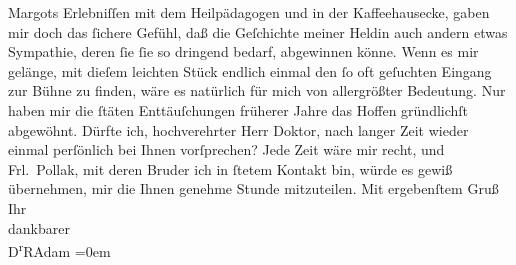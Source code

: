 \begin{ledgroupsized}[t]{13cm}
                  Margots Erlebniſſen mit dem
               Heilpädagogen und in der Kaffeehausecke, gaben mir doch das ſichere Gefühl, daß die
               Geſchichte meiner Heldin auch andern etwas Sympathie, deren ſie ſie so dringend
               bedarf, abgewinnen könne. Wenn es mir gelänge, mit dieſem leichten Stück endlich
               einmal den ſo oft geſuchten Eingang zur Bühne zu finden, wäre es natürlich für mich
               von allergrößter Bedeutung. Nur haben mir die ſtäten Enttäuſchungen früherer Jahre
               das Hoffen gründlichſt abgewöhnt.\pend
           \pstart
           {\pb}Dürfte ich, hochverehrter Herr Doktor,
               nach langer Zeit wieder einmal perſönlich bei Ihnen vorſprechen? Jede Zeit wäre mir
               recht, und Frl. Pollak, mit deren Bruder ich in ſtetem Kontakt
               bin, würde es gewiß übernehmen, mir die Ihnen genehme Stunde mitzuteilen.\pend
           \pstart
           Mit ergebenſtem Gruß Ihr{\\[\baselineskip]}dankbarer{\\[\baselineskip]}\spacefill\mbox{D\textsuperscript{r}RAdam}\pend
           \leftskip=0em{}\endnumbering{}\end{ledgroupsized}  \newcommand{\dateiname}{L02510}\newcommand{\titel}{Robert Adam an Arthur Schnitzler, 7. 6. 1929}\newcommand{\editorInnen}{Martin Anton Müller und Gerd-Hermann Susen}
      